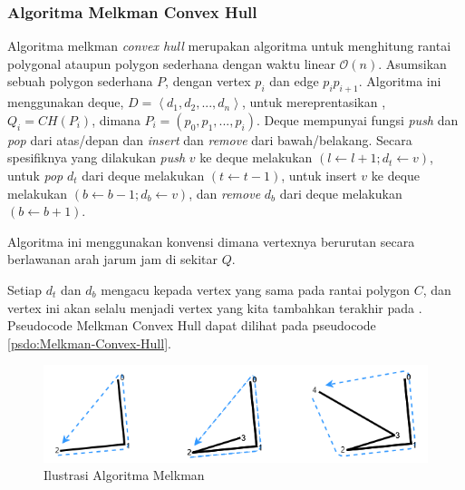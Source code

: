 \subsubsection{Algoritma Melkman Convex Hull}
\label{sec:algoritma-melkman-convex-hull}
Algoritma melkman \textit{convex hull} merupakan algoritma untuk menghitung rantai polygonal ataupun polygon sederhana dengan waktu linear $\mathcal{O}(n)$\cite{melkman_algorithm}. Asumsikan sebuah polygon sederhana $P$, dengan vertex $p_i$ dan edge $p_i p_{i+1}$. Algoritma ini menggunakan deque, $D = \left \langle d_1, d_2, ..., d_n \right \rangle$, untuk mereprentasikan \CH, $Q_i = CH(P_i)$, dimana $P_i = (p_0, p_1, ..., p_i)$. Deque mempunyai fungsi \textit{push} dan \textit{pop} dari atas/depan dan \textit{insert} dan \textit{remove} dari bawah/belakang. Secara spesifiknya yang dilakukan \textit{push} $v$ ke deque melakukan $(l \leftarrow l+1; d_t \leftarrow v)$, untuk \textit{pop} $d_t$ dari deque melakukan $(t \leftarrow t-1)$, untuk insert $v$ ke deque melakukan $(b \leftarrow b-1; d_b \leftarrow v)$, dan \textit{remove} $d_b$ dari deque melakukan $(b \leftarrow b+1)$.
\par Algoritma ini menggunakan konvensi dimana vertexnya berurutan secara berlawanan arah jarum jam di sekitar \CH $Q$.
\par Setiap $d_t$ dan $d_b$ mengacu kepada vertex yang sama pada rantai polygon $C$, dan vertex ini akan selalu menjadi vertex yang kita tambahkan terakhir pada \CH. Pseudocode Melkman Convex Hull dapat dilihat pada pseudocode \ref{psdo:Melkman-Convex-Hull}.
\begin{figure}[!h]
	\Centering
	\includegraphics [width=\columnwidth]{bab2/img/ilustrasi-algoritma-melkman}
	\caption {Ilustrasi Algoritma Melkman}
	\label {fig:ilustrasi-algoritma-melkman}
\end{figure}
